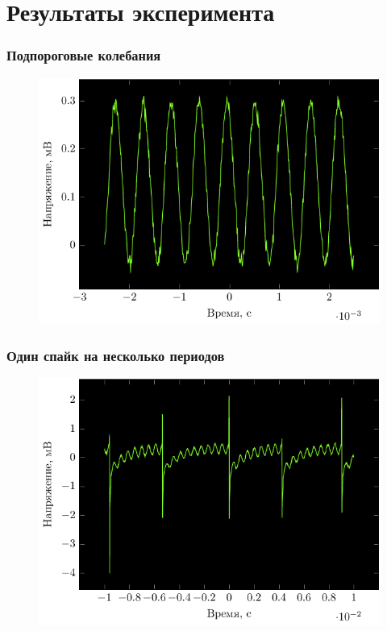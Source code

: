 \section{Результаты эксперимента}
\begin{frame}%
	\frametitle{Подпороговые колебания}
	\begin{figure}[h]
		\hspace{-2em}
		\includegraphics[]{img/osci}
	\end{figure}
\end{frame}
\begin{frame}%
	\frametitle{Один спайк на несколько периодов}
	\begin{figure}[h]
		\hspace{-2em}
		\includegraphics[]{img/spike}
	\end{figure}
\end{frame}

